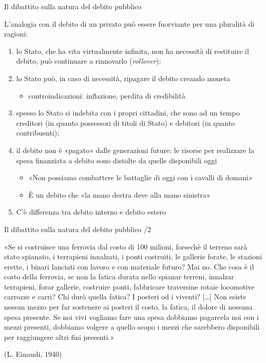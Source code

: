 \documentclass[aspectratio=64,11pt]{beamer}
\begin{document}
\begin{frame}{Il dibattito sulla natura del debito pubblico}

  L'analogia con il debito di un privato può essere fuorviante per una
  pluralità di ragioni:
  \begin{enumerate}
  \item lo Stato, che ha vita virtualmente infinita, non ha necessità di
    restituire il debito, può continuare a rinnovarlo (\emph{rollover});
  \item lo Stato può, in caso di necessità, ripagare il debito creando moneta
    \begin{itemize}
    \item controindicazioni: inflazione, perdita di credibilità
    \end{itemize}
  \item spesso lo Stato si indebita con i propri cittadini, che sono ad un
    tempo creditori (in quanto possessori di titoli di Stato) e debitori (in
    quanto contribuenti);
  \item il debito non è «pagato» dalle generazioni future: le risorse per
    realizzare la spesa finanziata a debito sono distolte da quelle
    disponibili oggi
    \begin{itemize}
    \item «Non possiamo combattere le battaglie di oggi con i cavalli di
      domani»
    \item È un debito che «la mano destra deve alla mano sinistra»
    \end{itemize}
  \item C'è differenza tra debito interno e debito estero
  \end{enumerate}
\end{frame}

\begin{frame}{Il dibattito sulla natura del debito pubblico /2}

  \begin{quoting}
    \small «Se si costruisce una ferrovia dal costo di 100 milioni,
    forsechè il terreno sarà stato spianato, i terrapieni innalzati, i ponti
    costruiti, le gallerie forate, le stazioni erette, i binari lanciati con
    lavoro e con materiale futuro?  Mai no. Che cosa è il costo della
    ferrovia, se non la fatica durata nello spianar terreni, innalzar
    terrapieni, forar gallerie, costruire ponti, fabbricare traversine rotaie
    locomotive carrozze e carri? Chi durò quella fatica?  I posteri od i
    viventi? […] Non esiste nessun mezzo per far sostenere ai posteri il
    costo, la fatica, il dolore di nessuna spesa presente. Se noi vivi
    vogliamo fare una spesa dobbiamo pagarcela noi con i mezzi presenti,
    dobbiamo volgere a quello scopo i mezzi che sarebbero disponibili per
    raggiungere altri fini presenti.»

    (L. Einaudi, 1940)
  \end{quoting}
\end{frame}
\end{document}
